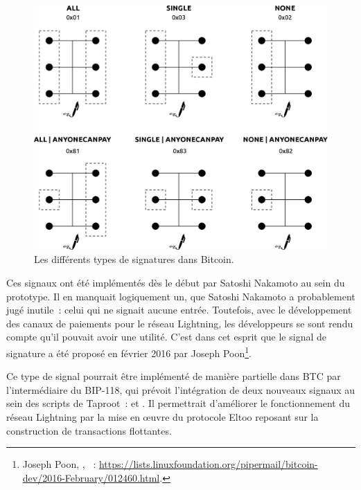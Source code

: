 \begin{figure}[ht]
  \centering
  \includegraphics[scale=0.45]{img/signature-hash-types.eps}
  \caption{Les différents types de signatures dans Bitcoin.}
  \label{fig:signature-hash-types}
\end{figure}


Ces signaux ont été implémentés dès le début par Satoshi Nakamoto au sein du prototype. Il en manquait logiquement un, que Satoshi Nakamoto a probablement jugé inutile~: celui qui ne signait aucune entrée. Toutefois, avec le développement des canaux de paiements pour le réseau Lightning, les développeurs se sont rendu compte qu'il pouvait avoir une utilité. C'est dans cet esprit que le signal de signature  a été proposé en février 2016 par Joseph Poon\footnote{Joseph Poon, , ~: \url{https://lists.linuxfoundation.org/pipermail/bitcoin-dev/2016-February/012460.html}.}.

Ce type de signal pourrait être implémenté de manière partielle dans BTC par l'intermédiaire du BIP-118, qui prévoit l'intégration de deux nouveaux signaux au sein des scripts de Taproot~:  et . Il permettrait d'améliorer le fonctionnement du réseau Lightning par la mise en œuvre du protocole Eltoo reposant sur la construction de transactions flottantes.

